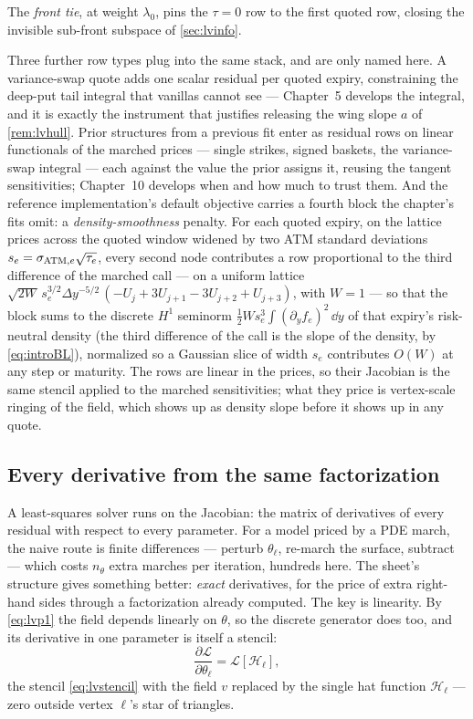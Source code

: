 The \emph{front tie}, at weight $\lambda_0$, pins the $\tau=0$ row to
the first quoted row, closing the invisible sub-front subspace of
\cref{sec:lvinfo}.

Three further row types plug into the same stack, and are only named
here.  A variance-swap quote adds one
scalar residual per quoted expiry, constraining the deep-put tail
integral that vanillas cannot see --- Chapter~5 develops the integral,
and it is exactly the instrument that justifies releasing the wing
slope $a$ of \cref{rem:lvhull}.  Prior structures from a previous
fit enter as residual rows on linear functionals of the marched prices
--- single strikes, signed baskets, the variance-swap integral ---
each against the value the prior assigns it, reusing the tangent
sensitivities; Chapter~10 develops when and how much to trust them.
And the reference implementation's default objective carries a fourth
block the chapter's fits omit: a \emph{density-smoothness} penalty.
For each quoted expiry, on the lattice prices across the quoted window
widened by two ATM standard deviations $s_e=\sigma_{{\rm ATM},e}\sqrt{\tau_e}$,
every second node contributes a row proportional to the third
difference of the marched call --- on a uniform lattice
$\sqrt{2W}\,s_e^{3/2}\Delta y^{-5/2}\,(-U_j+3U_{j+1}-3U_{j+2}+U_{j+3})$,
with $W=1$ --- so that the block sums to the discrete $H^1$ seminorm
$\tfrac12 W s_e^{3}\int(\partial_y f_e)^{2}\,\dd y$ of that expiry's
risk-neutral density (the third difference of the call is the slope of
the density, by \cref{eq:introBL}), normalized so a Gaussian slice of
width $s_e$ contributes $O(W)$ at any step or maturity.  The rows are
linear in the prices, so their Jacobian is the same stencil applied to
the marched sensitivities; what they price is vertex-scale ringing of
the field, which shows up as density slope before it shows up in any
quote.

\subsection{Every derivative from the same factorization}

A least-squares solver runs on the Jacobian: the matrix of derivatives
of every residual with respect to every parameter.  For a model priced
by a PDE march, the naive route is finite differences --- perturb
$\theta_\ell$, re-march the surface, subtract --- which costs
$n_\theta$ extra marches per iteration, hundreds here.  The sheet's
structure gives something better: \emph{exact} derivatives, for the
price of extra right-hand sides through a factorization already
computed.  The key is linearity.  By \eqref{eq:lvp1} the field depends
linearly on $\theta$, so the discrete generator does too, and its
derivative in one parameter is itself a stencil:
\[
\frac{\partial\mathcal L}{\partial\theta_\ell}
=\mathcal L[\mathcal H_\ell],
\]
the stencil \eqref{eq:lvstencil} with the field $v$ replaced by the
single hat function $\mathcal H_\ell$ --- zero outside vertex $\ell$'s
star of triangles.

